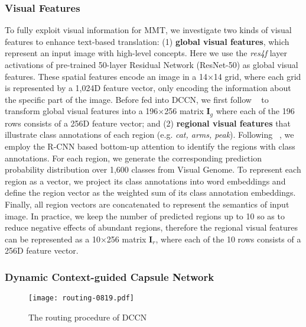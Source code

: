 \documentclass[sigconf]{acmart}
\begin{document}
\subsubsection{Visual Features}\label{sec_visual_features}
To fully exploit visual information for MMT, we investigate two kinds of visual features to enhance text-based translation: 
(1) \textbf{global visual features}, which represent an input image with high-level concepts. Here we use the \textit{res4f} layer activations of pre-trained 50-layer Residual Network (ResNet-50)\cite{resnet} as global visual features. These spatial features encode an image in a 14×14 grid, where each grid is represented by a 1,024D feature vector, only encoding the information about the specific part of the image. 
Before fed into DCCN, we first follow \citeauthor{calixto2017doubly}~ to transform global visual features into a 196×256 matrix $\mathbf{I}_g$ 
where each of the 196 rows consists of a 256D feature vector; and 
(2) \textbf{regional visual features} that illustrate class annotations of each region (e.g. \emph{cat, arms, peak}). 
Following \citeauthor{bottom-up-attention}~, we employ the R-CNN based bottom-up attention to identify the regions with class annotations. 
For each region, we generate the corresponding prediction probability distribution over 1,600 classes from Visual Genome. 
To represent each region as a vector, we project its class annotations into word embeddings and define the region vector as the weighted sum of its class annotation embeddings. Finally, all region vectors are concatenated to represent the semantics of input image. In practice, we keep the number of predicted regions up to 10 so as to reduce negative effects of abundant regions, therefore the regional visual features can be represented as a 10×256 matrix $\mathbf{I}_r$,  where each of the 10 rows consists of a 256D feature vector.





\subsubsection{Dynamic Context-guided Capsule Network}\label{sec_dccn}

\begin{figure}[t]
\centering
\texttt{[image: routing-0819.pdf]} 
\caption{The routing procedure of DCCN}
\label{Fig_capsmall}
\end{figure}
\end{document}
